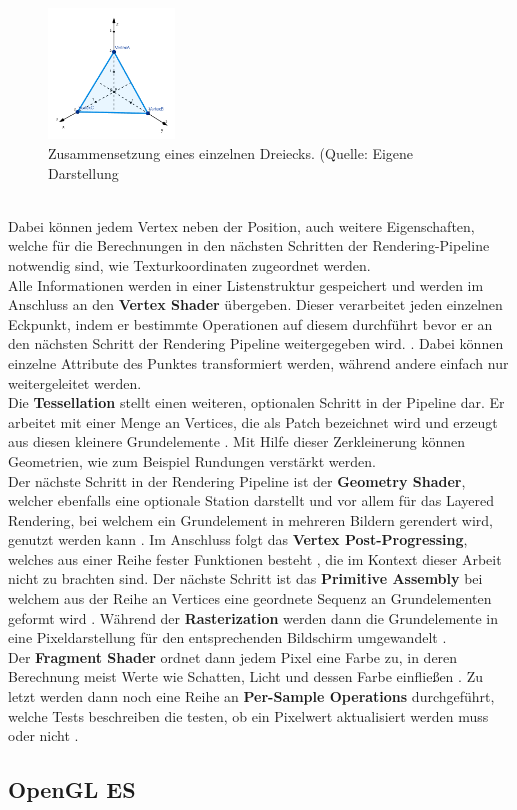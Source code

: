 \begin{figure}[h!]
\centering
\includegraphics[width=0.3\textwidth]{Abbildungen/triangle.png}
\caption[OpenGL Triangle]{Zusammensetzung eines einzelnen Dreiecks. (Quelle: Eigene Darstellung}
\label{fig:opengl-trangle}
\end{figure}\\
Dabei können jedem Vertex neben der Position, auch weitere Eigenschaften, welche für die Berechnungen in den nächsten Schritten der Rendering-Pipeline notwendig sind, wie Texturkoordinaten zugeordnet werden. \\
Alle Informationen werden in einer Listenstruktur gespeichert und werden im Anschluss an den \textbf{Vertex Shader} übergeben.
Dieser verarbeitet jeden einzelnen Eckpunkt, indem er bestimmte Operationen auf diesem durchführt bevor er an den nächsten Schritt der Rendering Pipeline weitergegeben wird. \citep{vries:learn-opengl-triangle}. Dabei können einzelne Attribute des Punktes transformiert werden, während andere einfach nur weitergeleitet werden.\\
Die \textbf{Tessellation} stellt einen weiteren, optionalen Schritt in der Pipeline dar. Er arbeitet mit einer Menge an Vertices, die als Patch bezeichnet wird und erzeugt aus diesen kleinere Grundelemente \citep{khronos:tessellation}. Mit Hilfe dieser Zerkleinerung können Geometrien, wie zum Beispiel Rundungen verstärkt werden.\\
Der nächste Schritt in der Rendering Pipeline ist der \textbf{Geometry Shader}, welcher ebenfalls eine optionale Station darstellt und vor allem für das Layered Rendering, bei welchem ein Grundelement in mehreren Bildern gerendert wird, genutzt werden kann \citep{khronos:geometry-shader}. 
Im Anschluss folgt das \textbf{Vertex Post-Progressing}, welches aus einer Reihe fester Funktionen besteht \citep{khronos:rendering-pipeline}, die im Kontext dieser Arbeit nicht zu brachten sind.
Der nächste Schritt ist das \textbf{Primitive Assembly} bei welchem aus der Reihe an Vertices eine geordnete Sequenz an Grundelementen geformt wird \citep{khronos:rendering-pipeline}. 
Während der \textbf{Rasterization} werden dann die Grundelemente in eine Pixeldarstellung für den entsprechenden Bildschirm umgewandelt \citep{vries:learn-opengl-triangle}.\\
Der \textbf{Fragment Shader} ordnet dann jedem Pixel eine Farbe zu, in deren Berechnung meist Werte wie Schatten, Licht und dessen Farbe einfließen \citep{vries:learn-opengl-triangle}.
Zu letzt werden dann noch eine Reihe an \textbf{Per-Sample Operations} durchgeführt, welche Tests beschreiben die testen, ob ein Pixelwert aktualisiert werden muss oder nicht \citep{khronos:rendering-pipeline}.
\subsection{OpenGL ES}




